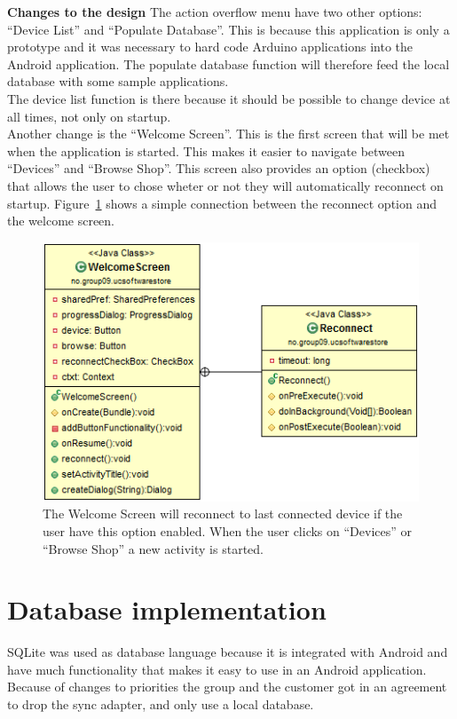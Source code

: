 	\textbf{Changes to the design}
	The action overflow menu have two other options: ``Device List'' and ``Populate Database''. This is because this application is only a prototype and it was necessary to hard code Arduino applications into the Android application. The populate database function will therefore feed the local database with some sample applications.\\

	The device list function is there because it should be possible to change device at all times, not only on startup.\\

	Another change is the ``Welcome Screen''. This is the first screen that will be met when the application is started. This makes it easier to navigate between ``Devices'' and ``Browse Shop''. This screen also provides an option (checkbox) that allows the user to chose wheter or not they will automatically reconnect on startup. Figure~\ref{fig:welcomescreen} shows a simple connection between the reconnect option and the welcome screen.

	\begin{figure}[H]
	\centering
	\includegraphics[scale=0.85]{images/UML/welcomescreen.png}
	\caption[UML - Welcome Screen]{The Welcome Screen will reconnect to last connected device if the user have this option enabled. When the user clicks on ``Devices'' or ``Browse Shop'' a new activity is started.}
	\label{fig:welcomescreen}
	\end{figure}

\section{Database implementation}

	SQLite was used as database language because it is integrated with Android and have much functionality that makes it easy to use in an Android application. Because of changes to priorities the group and the customer got in an agreement to drop the sync adapter, and only use a local database.

